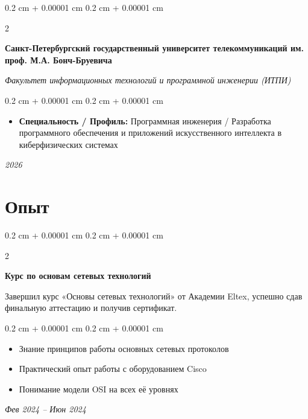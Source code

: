 \documentclass[10pt, letterpaper]{article}
\newenvironment{highlights}{
    \begin{itemize}[
        topsep=0.20 cm,
        parsep=0.20 cm,
        partopsep=0pt,
        itemsep=0pt,
        leftmargin=0.4 cm + 10pt
    ]
}{
    \end{itemize}
} %
\newenvironment{onecolentry}{
    \begin{adjustwidth}{
        0.2 cm + 0.00001 cm
    }{
        0.2 cm + 0.00001 cm
    }
}{
    \end{adjustwidth}
} %
\newenvironment{twocolentry}[2][]{
    \onecolentry
    \def\secondColumn{#2}
    \setcolumnwidth{\fill, 4.5 cm}
    \begin{paracol}{2}
}{
    \switchcolumn \raggedleft \secondColumn
    \end{paracol}
    \endonecolentry
} %
\begin{document}
        \begin{twocolentry}{

        \textit{2026}}
            \textbf{Санкт-Петербургский государственный университет телекоммуникаций им. проф. М.А. Бонч-Бруевича}

            \textit{Факультет информационных технологий и программной инженерии (ИТПИ)}

        \vspace{0.10 cm}
        \begin{onecolentry}
            \begin{highlights}

                \item \textbf{Специальность / Профиль:} Программная инженерия / Разработка программного обеспечения и приложений искусственного интеллекта в киберфизических системах
            \end{highlights}
        \end{onecolentry}
        
        \end{twocolentry}


    \section{Опыт}
    \begin{twocolentry}{
        \textit{Фев 2024 – Июн 2024}}
        
            \textbf{Курс по основам сетевых технологий}
                \item Завершил курс «Основы сетевых технологий» от Академии Eltex, успешно сдав финальную аттестацию и получив сертификат.

            \textit{}
        

        \begin{onecolentry}
            \begin{highlights}
                \item Знание принципов работы основных сетевых протоколов 
                \item Практический опыт работы с оборудованием Cisco
                \item Понимание модели OSI на всех её уровнях

            \end{highlights}
        \end{onecolentry}
        \end{twocolentry}
\end{document}
